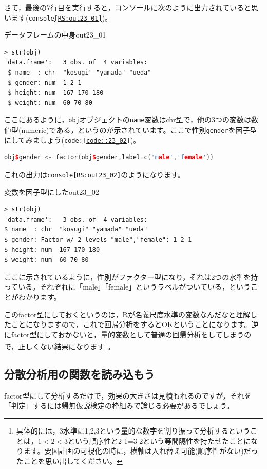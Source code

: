 \documentclass{ltjsarticle}
\begin{document}
さて，最後の7行目を実行すると，コンソールに次のように出力されていると思います(\texttt{console\ref{RS:out23_01}})。
\begin{Rscreen}{データフレームの中身}{out23_01}
\begin{verbatim}
> str(obj)
'data.frame':	3 obs. of  4 variables:
 $ name  : chr  "kosugi" "yamada" "ueda"
 $ gender: num  1 2 1
 $ height: num  167 170 180
 $ weight: num  60 70 80
\end{verbatim}
\end{Rscreen}
ここにあるように，\texttt{obj}オブジェクトの\texttt{name}変数はchr型で，他の3つの変数は数値型(numeric)である，というのが示されています。ここで性別\texttt{gender}を因子型にしてみましょう(\texttt{code:\ref{code::23_02}})。

\begin{lstlisting}[language=c++,label={code::23_02},caption={因子型にする}]
obj$gender <- factor(obj$gender,label=c('male','female'))
\end{lstlisting}

これの出力は\texttt{console\ref{RS:out23_02}}のようになります。
\begin{Rscreen}{変数を因子型にした}{out23_02}
  \begin{verbatim}
> str(obj)
'data.frame':	3 obs. of  4 variables:
$ name  : chr  "kosugi" "yamada" "ueda"
$ gender: Factor w/ 2 levels "male","female": 1 2 1
$ height: num  167 170 180
$ weight: num  60 70 80
\end{verbatim}
\end{Rscreen}
ここに示されているように，性別がファクター型になり，それは2つの水準を持っている。それぞれに「male」「female」というラベルがついている，ということがわかります。

このfactor型にしておくというのは，Rが名義尺度水準の変数なんだなと理解したことになりますので，これで回帰分析をするとOKということになります。逆にfactor型にしておかないと，量的変数として普通の回帰分析をしてしまうので，正しくない結果になります\footnote{具体的には，3水準に1,2,3という量的な数字を割り振って分析するということは，$1<2<3$という順序性と2-1=3-2という等間隔性を持たせたことになります。要因計画の可視化の時に，横軸は入れ替え可能(順序性がない)だったことを思い出してください。}。

\subsection{分散分析用の関数を読み込もう}
factor型にして分析するだけで，効果の大きさは見積もれるのですが，それを「判定」するには帰無仮説検定の枠組みで論じる必要があるでしょう。
\end{document}
